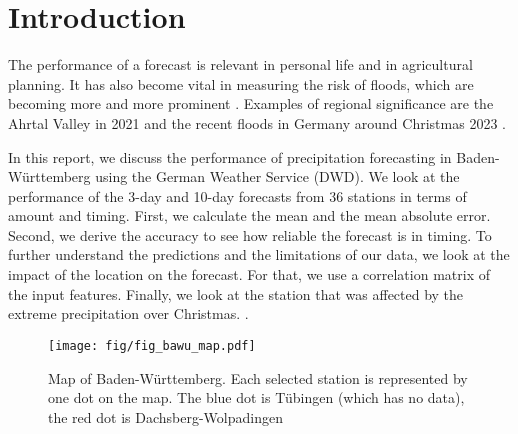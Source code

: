 \documentclass{article}
\theoremstyle{plain}
\theoremstyle{definition}
\theoremstyle{remark}
\begin{document}
\section{Introduction}\label{sec:intro}
The performance of a forecast is relevant in personal life and in agricultural
planning.
It has also become vital in measuring the risk of floods, which are becoming
more and more prominent \cite{FloodTrends}.
Examples of regional significance are the Ahrtal Valley in 2021 \cite{pink} and
the recent floods in Germany around Christmas 2023 \cite{flooding_christmas}.

In this report, we discuss the performance of precipitation forecasting in
Baden-Württemberg using the German Weather Service (DWD).
We look at the performance of the 3-day and 10-day forecasts from 36 stations
in terms of amount and timing. First, we calculate the mean and the mean
absolute error. Second, we derive the accuracy to see how reliable the forecast
is in timing.
To further understand the predictions and the limitations of our data, we look
at the impact of the location on the forecast.
For that, we use a correlation matrix of the input features. Finally, we look
at the station that was affected by the extreme precipitation over Christmas.
\cite{flooding_christmas}.

\begin{figure}[h]
    \centering
    \texttt{[image: fig/fig\_bawu\_map.pdf]}
    \caption{Map of Baden-Württemberg. Each selected station is represented by
        one dot on the map. The blue dot is Tübingen (which has no data), the red dot
        is Dachsberg-Wolpadingen}
    \label{fig:bw-stations}
\end{figure}
\end{document}
